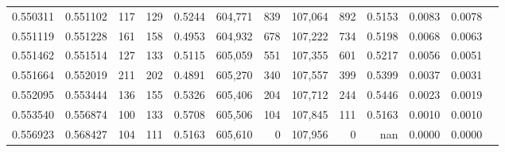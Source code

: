\begin{tabular}{rrrrrrrrrrrrr}
0.550311 & 0.551102 &   117 &   129 &                                     0.5244 & 604,771 &     839 & 107,064 &     892 & 0.5153 & 0.0083 & 0.0078 \\
0.551119 & 0.551228 &   161 &   158 &                                     0.4953 & 604,932 &     678 & 107,222 &     734 & 0.5198 & 0.0068 & 0.0063 \\
0.551462 & 0.551514 &   127 &   133 &                                     0.5115 & 605,059 &     551 & 107,355 &     601 & 0.5217 & 0.0056 & 0.0051 \\
0.551664 & 0.552019 &   211 &   202 &                                     0.4891 & 605,270 &     340 & 107,557 &     399 & 0.5399 & 0.0037 & 0.0031 \\
0.552095 & 0.553444 &   136 &   155 &                                     0.5326 & 605,406 &     204 & 107,712 &     244 & 0.5446 & 0.0023 & 0.0019 \\
0.553540 & 0.556874 &   100 &   133 &                                     0.5708 & 605,506 &     104 & 107,845 &     111 & 0.5163 & 0.0010 & 0.0010 \\
0.556923 & 0.568427 &   104 &   111 &                                     0.5163 & 605,610 &       0 & 107,956 &       0 &    nan & 0.0000 & 0.0000 \\
\bottomrule
\end{tabular}

